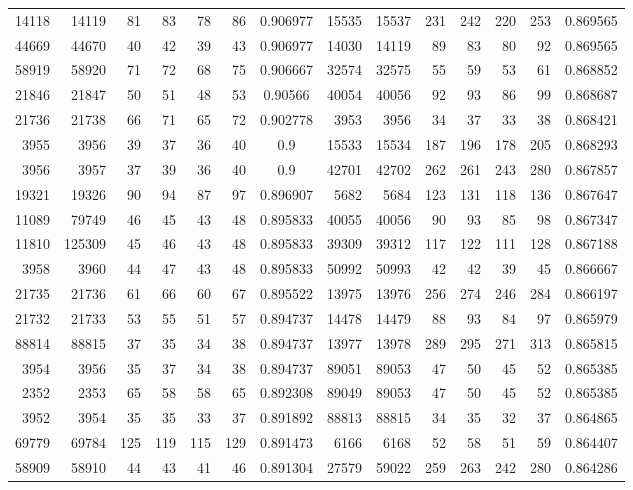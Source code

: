 \documentclass[10pt,twocolumn]{article}
\begin{document}
\begin{table}[t]
\begin{tabular}{rrrrrrc@{\hspace{1em}}rrrrrrc}
14118 & 14119 & 81 & 83 & 78 & 86 & 0.906977 & 15535 & 15537 & 231 & 242 & 220 & 253 & 0.869565 \\
44669 & 44670 & 40 & 42 & 39 & 43 & 0.906977 & 14030 & 14119 & 89 & 83 & 80 & 92 & 0.869565 \\
58919 & 58920 & 71 & 72 & 68 & 75 & 0.906667 & 32574 & 32575 & 55 & 59 & 53 & 61 & 0.868852 \\
21846 & 21847 & 50 & 51 & 48 & 53 & 0.90566 & 40054 & 40056 & 92 & 93 & 86 & 99 & 0.868687 \\
21736 & 21738 & 66 & 71 & 65 & 72 & 0.902778 & 3953 & 3956 & 34 & 37 & 33 & 38 & 0.868421 \\
3955 & 3956 & 39 & 37 & 36 & 40 & 0.9 & 15533 & 15534 & 187 & 196 & 178 & 205 & 0.868293 \\
3956 & 3957 & 37 & 39 & 36 & 40 & 0.9 & 42701 & 42702 & 262 & 261 & 243 & 280 & 0.867857 \\
19321 & 19326 & 90 & 94 & 87 & 97 & 0.896907 & 5682 & 5684 & 123 & 131 & 118 & 136 & 0.867647 \\
11089 & 79749 & 46 & 45 & 43 & 48 & 0.895833 & 40055 & 40056 & 90 & 93 & 85 & 98 & 0.867347 \\
11810 & 125309 & 45 & 46 & 43 & 48 & 0.895833 & 39309 & 39312 & 117 & 122 & 111 & 128 & 0.867188 \\
3958 & 3960 & 44 & 47 & 43 & 48 & 0.895833 & 50992 & 50993 & 42 & 42 & 39 & 45 & 0.866667 \\
21735 & 21736 & 61 & 66 & 60 & 67 & 0.895522 & 13975 & 13976 & 256 & 274 & 246 & 284 & 0.866197 \\
21732 & 21733 & 53 & 55 & 51 & 57 & 0.894737 & 14478 & 14479 & 88 & 93 & 84 & 97 & 0.865979 \\
88814 & 88815 & 37 & 35 & 34 & 38 & 0.894737 & 13977 & 13978 & 289 & 295 & 271 & 313 & 0.865815 \\
3954 & 3956 & 35 & 37 & 34 & 38 & 0.894737 & 89051 & 89053 & 47 & 50 & 45 & 52 & 0.865385 \\
2352 & 2353 & 65 & 58 & 58 & 65 & 0.892308 & 89049 & 89053 & 47 & 50 & 45 & 52 & 0.865385 \\
3952 & 3954 & 35 & 35 & 33 & 37 & 0.891892 & 88813 & 88815 & 34 & 35 & 32 & 37 & 0.864865 \\
69779 & 69784 & 125 & 119 & 115 & 129 & 0.891473 & 6166 & 6168 & 52 & 58 & 51 & 59 & 0.864407 \\
58909 & 58910 & 44 & 43 & 41 & 46 & 0.891304 & 27579 & 59022 & 259 & 263 & 242 & 280 & 0.864286 \\
\bottomrule
\end{tabular}
\end{table}
\end{document}
